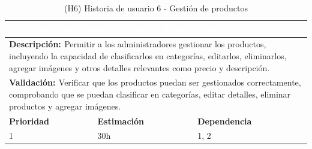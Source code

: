\begin{table}[H]
  \centering
  \renewcommand{\arraystretch}{1.5}
  \begin{tabular}{|p{}|p{}|p{}|}
    \hline
    \multicolumn{3}{|l|}{\cellcolor{OrangeVIU}\textcolor{white}{\textbf{(H6) Historia de usuario 6: Gestión de productos}}} \\
    \hline
    \multicolumn{3}{|p{\dimexpr0.9\linewidth+2\tabcolsep+2\arrayrulewidth}|}{{\textbf{\textcolor{naranja}{Descripción: }}}Permitir a los administradores gestionar los productos, incluyendo la capacidad de clasificarlos en categorías, editarlos, eliminarlos, agregar imágenes y otros detalles relevantes como precio y descripción.} \\
    \hline
    \multicolumn{3}{|p{\dimexpr0.9\linewidth+2\tabcolsep+2\arrayrulewidth}|}{{\textbf{\textcolor{naranja}{Validación: }} Verificar que los productos puedan ser gestionados correctamente, comprobando que se puedan clasificar en categorías, editar detalles, eliminar productos y agregar imágenes. }} \\
    \hline
    {\textbf{\textcolor{naranja}{Prioridad }}}  & {\textbf{\textcolor{naranja}{Estimación }}}  & {\textbf{\textcolor{naranja}{Dependencia }}}  \\
    \hline
    1 &  30h &  1, 2 \\
    \hline
  \end{tabular}
  \caption{(H6) Historia de usuario 6 - Gestión de productos}
  \label{table:H6}
\end{table}


